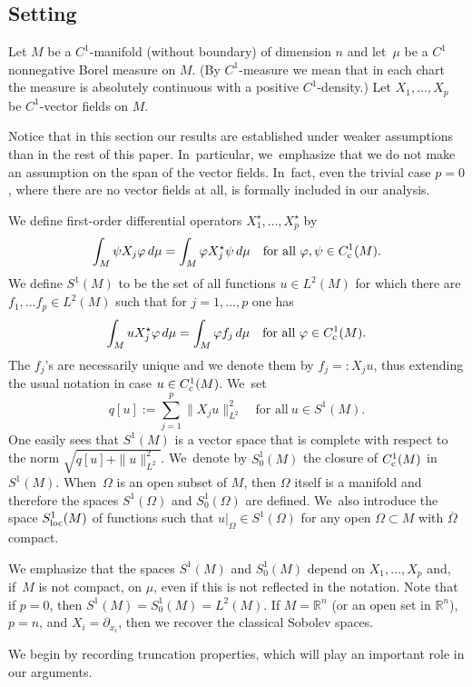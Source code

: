 \documentclass[JEP,XML,SOM,Unicode,published]{cedram}
\newcommand{\rc}{\textup{c}}
\newcommand{\loc}{\textup{loc}}
\theoremstyle{definition}
\let\phi\varphi
\newcommand{\1}{\mathbbm{1}}
\begin{document}
\subsection{Setting}\label{ss2.2}
Let $M$ be a $C^1$-manifold (without boundary) of dimension $n$ and let~$\mu$ be a $C^1$ nonnegative Borel measure on $M$. (By $C^1$-measure we mean that in each chart the measure is absolutely continuous with a positive $C^1$-density.) Let $X_1,\ldots,X_p$ be $C^1$-vector fields on $M$.

Notice that in this section our results are established under weaker assumptions than in the rest of this paper. In~particular, we~emphasize that we do not make an assumption on the span of the vector fields. In~fact, even the trivial case $p=0$, where there are no vector fields at all, is formally included in our analysis.

We define first-order differential operators $X_1^\star,\ldots,X_p^\star$ by
\[
\int_M \psi X_j \phi\,d\mu = \int_M \phi X_j^\star \psi\,d\mu
\quad\text{for all}\ \phi,\psi\in C^1_\rc(M).
\]
We define $S^1(M)$ to be the set of all functions $u\in L^2(M)$ for which there are $f_1,\ldots f_p\in L^2(M)$ such that for $j=1,\ldots,p$ one has
\[
\int_M u X_j^\star\phi\,d\mu = \int_M \phi f_j\,d\mu
\quad\text{for all}\ \phi\in C^1_\rc(M).
\]
The $f_j$'s are necessarily unique and we denote them by $f_j=:X_j u$, thus extending the usual notation in case $u\in C^1_\rc(M)$. We~set
\[
q[u] := \sum_{j=1}^p \|X_j u\|_{L^2}^2
\quad\text{for all}\ u\in S^1(M).
\]
One easily sees that $S^1(M)$ is a vector space that is complete with respect to the norm $\sqrt{q[u] + \|u\|_{L^2}^2}$. We~denote by $S^1_0(M)$ the closure of $C^1_\rc(M)$ in $S^1(M)$. When~$\Omega$ is an open subset of $M$, then $\Omega$ itself is a manifold and therefore the spaces $S^1(\Omega)$ and $S^1_0(\Omega)$ are defined. We~also introduce the space $S^1_\loc(M)$ of functions such that $u|_\Omega \in S^1(\Omega)$ for any open $\Omega\subset M$ with $\overline\Omega$ compact.

We emphasize that the spaces $S^1(M)$ and $S^1_0(M)$ depend on $X_1,\ldots,X_p$ and, if~$M$ is not compact, on $\mu$, even if this is not reflected in the notation. Note that if $p=0$, then $S^1(M)=S^1_0(M)=L^2(M)$.
If $M=\mathbb R^n$ (or an open set in $\mathbb R^n$), $p=n$, and $X_i=\partial_{x_i}$, then we recover the classical Sobolev spaces.

We begin by recording truncation properties, which will play an important role in our arguments.
\end{document}
